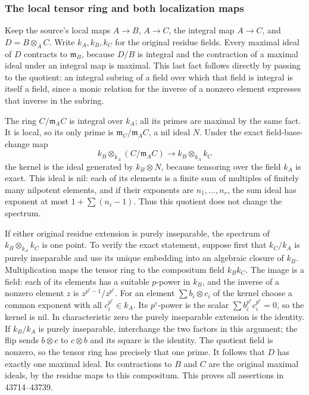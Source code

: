 \subsubsection{The local tensor ring and both localization maps}\label{algebra-proof-061-the-local-tensor-ring-and-both-localization-maps}

Keep the source's local maps \(A\to B\), \(A\to C\), the integral map \(A\to C\), and \(D=B\otimes_A C\). Write \(k_A,k_B,k_C\) for the original residue fields. Every maximal ideal of \(D\) contracts to \(\mathfrak m_B\), because \(D/B\) is integral and the contraction of a maximal ideal under an integral map is maximal. This last fact follows directly by passing to the quotient: an integral subring of a field over which that field is integral is itself a field, since a monic relation for the inverse of a nonzero element expresses that inverse in the subring.

The ring \(C/\mathfrak m_A C\) is integral over \(k_A\); all its primes are maximal by the same fact. It is local, so its only prime is \(\mathfrak m_C/\mathfrak m_A C\), a nil ideal \(N\). Under the exact field-base-change map \[
 k_B\otimes_{k_A}(C/\mathfrak m_A C)\longrightarrow k_B\otimes_{k_A}k_C
\] the kernel is the ideal generated by \(k_B\otimes N\), because tensoring over the field \(k_A\) is exact. This ideal is nil: each of its elements is a finite sum of multiples of finitely many nilpotent elements, and if their exponents are \(n_1,\ldots,n_r\), the sum ideal has exponent at most \(1+\sum(n_i-1)\). Thus this quotient does not change the spectrum.

If either original residue extension is purely inseparable, the spectrum of \(k_B\otimes_{k_A}k_C\) is one point. To verify the exact statement, suppose first that \(k_C/k_A\) is purely inseparable and use its unique embedding into an algebraic closure of \(k_B\). Multiplication maps the tensor ring to the compositum field \(k_Bk_C\). The image is a field: each of its elements has a suitable \(p\)-power in \(k_B\), and the inverse of a nonzero element \(z\) is \(z^{p^e-1}/z^{p^e}\). For an element \(\sum b_i\otimes c_i\) of the kernel choose a common exponent with all \(c_i^{p^e}\in k_A\). Its \(p^e\)-power is the scalar \(\sum b_i^{p^e}c_i^{p^e}=0\), so the kernel is nil. In characteristic zero the purely inseparable extension is the identity. If \(k_B/k_A\) is purely inseparable, interchange the two factors in this argument; the flip sends \(b\otimes c\) to \(c\otimes b\) and its square is the identity. The quotient field is nonzero, so the tensor ring has precisely that one prime. It follows that \(D\) has exactly one maximal ideal. Its contractions to \(B\) and \(C\) are the original maximal ideals, by the residue maps to this compositum. This proves all assertions in 43714--43739.


